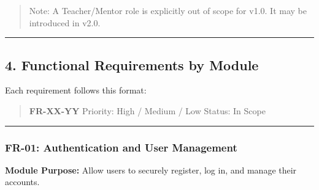 \documentclass[
]{article}
\begin{document}
\begin{quote}
Note: A Teacher/Mentor role is explicitly out of scope for v1.0. It may
be introduced in v2.0.
\end{quote}

\begin{center}\rule{0.5\linewidth}{0.5pt}\end{center}

\subsection{4. Functional Requirements by
Module}\label{functional-requirements-by-module}

Each requirement follows this format:

\begin{quote}
\textbf{FR-XX-YY} \textbar{} Priority: High / Medium / Low \textbar{}
Status: In Scope
\end{quote}

\begin{center}\rule{0.5\linewidth}{0.5pt}\end{center}

\subsubsection{FR-01: Authentication and User
Management}\label{fr-01-authentication-and-user-management}

\textbf{Module Purpose:} Allow users to securely register, log in, and
manage their accounts.
\end{document}
